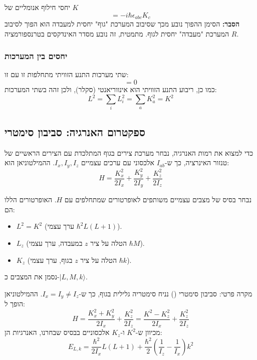 \begin{resultbox}{יחסי חילוף אנומליים של $K$}
\begin{equation}
    [K_a, K_b] = -i\hbar \epsilon_{abc} K_c
\end{equation}
\textbf{הסבר:} הסימן ההפוך נובע מכך שסיבוב המערכת "גוף" יחסית למעבדה הוא הפוך לסיבוב המערכת "מעבדה" יחסית לגוף. מתמטית, זה נובע מסדר האינדקסים בטרנספורמציה $R$.
\end{resultbox}

\subsubsection{יחסים בין המערכות}
שתי מערכות התנע הזוויתי מתחלפות זו עם זו:
\begin{equation}
    [L_i, K_a] = 0
\end{equation}
כמו כן, ריבוע התנע הזוויתי הוא אינווריאנטי (סקלר), ולכן זהה בשתי המערכות:
\begin{equation}
    L^2 = \sum_i L_i^2 = \sum_a K_a^2 = K^2
\end{equation}

\subsection{ספקטרום האנרגיה: סביבון סימטרי}

כדי למצוא את רמות האנרגיה, נבחר מערכת צירים בגוף המתלכדת עם הצירים הראשיים של טנזור האינרציה, כך ש-$I_{ab}$ אלכסוני עם ערכים עצמיים $I_x, I_y, I_z$. ההמילטוניאן הוא:
\begin{equation}
    H = \frac{K_x^2}{2I_x} + \frac{K_y^2}{2I_y} + \frac{K_z^2}{2I_z}
\end{equation}

נבחר בסיס של מצבים עצמיים משותפים לאופרטורים שמתחלפים עם $H$. האופרטורים הללו הם:
\begin{itemize}
    \item $L^2 = K^2$ (ערך עצמי $\hbar^2 L(L+1)$).
    \item $L_z$ (הטלה על ציר $z$ במעבדה, ערך עצמי $\hbar M$).
    \item $K_z$ (הטלה על ציר $z$ בגוף, ערך עצמי $\hbar k$).
\end{itemize}
נסמן את המצבים כ-$|L, M, k\rangle$.

\begin{examplebox}{מקרה פרטי: סביבון סימטרי ()}
נניח סימטריה גלילית בגוף, כך ש-$I_x = I_y \neq I_z$. ההמילטוניאן הופך ל:
\begin{equation}
    H = \frac{K_x^2 + K_y^2}{2I_x} + \frac{K_z^2}{2I_z} = \frac{K^2 - K_z^2}{2I_x} + \frac{K_z^2}{2I_z}
\end{equation}
מכיוון ש-$K^2$ ו-$K_z$ אלכסוניים בבסיס שבחרנו, האנרגיות הן:
\begin{equation}
    E_{L,k} = \frac{\hbar^2}{2I_x} L(L+1) + \frac{\hbar^2}{2} \left( \frac{1}{I_z} - \frac{1}{I_x} \right) k^2
\end{equation}
\end{examplebox}

